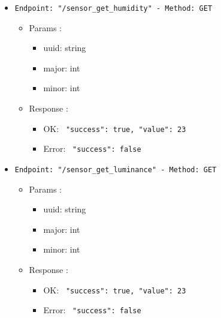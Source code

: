 \begin{itemize}
  \item \texttt{Endpoint: "/sensor_get_humidity" -  Method: GET}
  \begin{itemize} 
    \item Params :
    \begin{itemize}
      \item uuid: string
      \item major: int
      \item minor: int
    \end{itemize}

    \item Response : 
    \begin{itemize}
      \item OK: \texttt{{ "success": true, "value": 23 }}
      \item Error: \texttt{{ "success": false }}
    \end{itemize}
  \end{itemize}
\end{itemize}

\begin{itemize}
  \item \texttt{Endpoint: "/sensor_get_luminance" -  Method: GET}
  \begin{itemize} 
    \item Params :
    \begin{itemize}
      \item uuid: string
      \item major: int
      \item minor: int
    \end{itemize}

    \item Response : 
    \begin{itemize}
      \item OK: \texttt{{ "success": true, "value": 23 }}
      \item Error: \texttt{{ "success": false }}
    \end{itemize}
  \end{itemize}
\end{itemize}

